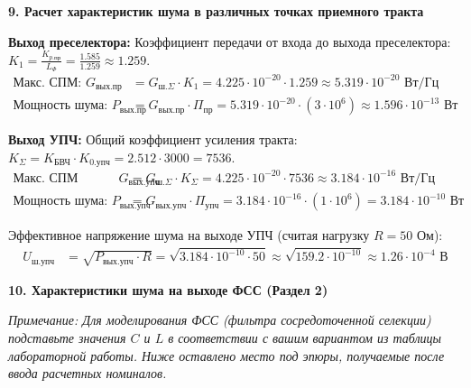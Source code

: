 \vspace{1em}
\textbf{9. Расчет характеристик шума в различных точках приемного тракта}

\textbf{Выход преселектора:}
Коэффициент передачи от входа до выхода преселектора: $K_1 = \frac{K_{p.\text{пр}}}{L_{\Phi}} = \frac{1.585}{1.259} \approx 1.259$.
\begin{align*}
\text{Макс. СПМ: } G_{\text{вых.пр}} &= G_{ш.\Sigma} \cdot K_1 = 4.225 \cdot 10^{-20} \cdot 1.259 \approx 5.319 \cdot 10^{-20} \text{ Вт/Гц} \\
\text{Мощность шума: } P_{\text{вых.пр}} &= G_{\text{вых.пр}} \cdot \Pi_{\text{пр}} = 5.319 \cdot 10^{-20} \cdot (3 \cdot 10^6) \approx 1.596 \cdot 10^{-13} \text{ Вт}
\end{align*}

\textbf{Выход УПЧ:}
Общий коэффициент усиления тракта: $K_{\Sigma} = K_{\text{БВЧ}} \cdot K_{0.\text{упч}} = 2.512 \cdot 3000 = 7536$.
\begin{align*}
\text{Макс. СПМ дисперсии: } G_{\text{вых.упч}} &= G_{ш.\Sigma} \cdot K_{\Sigma} = 4.225 \cdot 10^{-20} \cdot 7536 \approx 3.184 \cdot 10^{-16} \text{ Вт/Гц} \\
\text{Мощность шума: } P_{\text{вых.упч}} &= G_{\text{вых.упч}} \cdot \Pi_{\text{упч}} = 3.184 \cdot 10^{-16} \cdot (1 \cdot 10^6) = 3.184 \cdot 10^{-10} \text{ Вт}
\end{align*}

Эффективное напряжение шума на выходе УПЧ (считая нагрузку $R = 50 \text{ Ом}$):
\begin{align*}
U_{\text{ш.упч}} &= \sqrt{P_{\text{вых.упч}} \cdot R} = \sqrt{3.184 \cdot 10^{-10} \cdot 50} \approx \sqrt{159.2 \cdot 10^{-10}} \approx 1.26 \cdot 10^{-4} \text{ В}
\end{align*}

\begin{center}
\end{center}

\vspace{1em}
\textbf{10. Характеристики шума на выходе ФСС (Раздел 2)}

\textit{Примечание: Для моделирования ФСС (фильтра сосредоточенной селекции) подставьте значения $C$ и $L$ в соответствии с вашим вариантом из таблицы лабораторной работы. Ниже оставлено место под эпюры, получаемые после ввода расчетных номиналов.}


